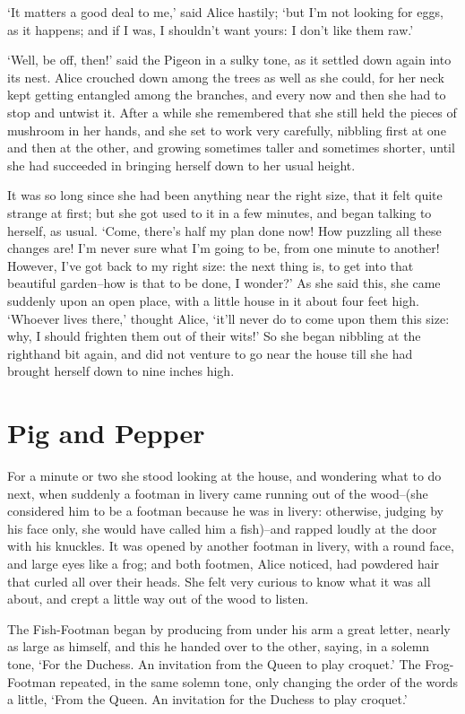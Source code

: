 \documentclass[statementpaper,twoside,openany]{memoir}
\begin{document}
`It matters a good deal to me,' said Alice hastily; `but I'm not looking for eggs, as it happens; and if I was, I shouldn't want yours: I don't like them raw.'

`Well, be off, then!' said the Pigeon in a sulky tone, as it settled down again into its nest. Alice crouched down among the trees as well as she could, for her neck kept getting entangled among the branches, and every now and then she had to stop and untwist it. After a while she remembered that she still held the pieces of mushroom in her hands, and she set to work very carefully, nibbling first at one and then at the other, and growing sometimes taller and sometimes shorter, until she had succeeded in bringing herself down to her usual height.

It was so long since she had been anything near the right size, that it felt quite strange at first; but she got used to it in a few minutes, and began talking to herself, as usual. `Come, there's half my plan done now! How puzzling all these changes are! I'm never sure what I'm going to be, from one minute to another! However, I've got back to my right size: the next thing is, to get into that beautiful garden--how is that to be done, I wonder?' As she said this, she came suddenly upon an open place, with a little house in it about four feet high. `Whoever lives there,' thought Alice, `it'll never do to come upon them this size: why, I should frighten them out of their wits!' So she began nibbling at the righthand bit again, and did not venture to go near the house till she had brought herself down to nine inches high.

\chapter{Pig and Pepper}

For a minute or two she stood looking at the house, and wondering what to do next, when suddenly a footman in livery came running out of the wood--(she considered him to be a footman because he was in livery: otherwise, judging by his face only, she would have called him a fish)--and rapped loudly at the door with his knuckles. It was opened by another footman in livery, with a round face, and large eyes like a frog; and both footmen, Alice noticed, had powdered hair that curled all over their heads. She felt very curious to know what it was all about, and crept a little way out of the wood to listen.

The Fish-Footman began by producing from under his arm a great letter, nearly as large as himself, and this he handed over to the other, saying, in a solemn tone, `For the Duchess. An invitation from the Queen to play croquet.' The Frog-Footman repeated, in the same solemn tone, only changing the order of the words a little, `From the Queen. An invitation for the Duchess to play croquet.'
\end{document}
